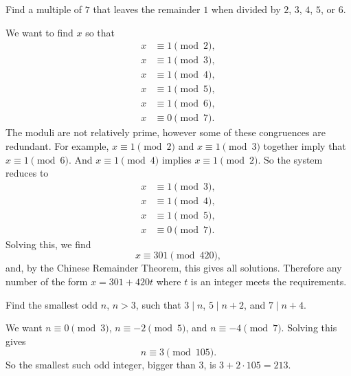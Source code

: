  Find a multiple of $7$ that leaves the remainder $1$ when
divided by $2$, $3$, $4$, $5$, or $6$.
\begin{solution}
  We want to find $x$ so that
  \begin{align*}
    x&\equiv1\pmod2, \\
    x&\equiv1\pmod3, \\
    x&\equiv1\pmod4, \\
    x&\equiv1\pmod5, \\
    x&\equiv1\pmod6, \\
    x&\equiv0\pmod7.
  \end{align*}
  The moduli are not relatively prime, however some of these
  congruences are redundant. For example, $x\equiv1\pmod2$ and
  $x\equiv1\pmod3$ together imply that $x\equiv1\pmod6$. And
  $x\equiv1\pmod4$ implies $x\equiv1\pmod2$. So the system reduces to
  \begin{align*}
    x&\equiv1\pmod3, \\
    x&\equiv1\pmod4, \\
    x&\equiv1\pmod5, \\
    x&\equiv0\pmod7.
  \end{align*}
  Solving this, we find
  \begin{equation*}
    x\equiv301 \pmod{420},
  \end{equation*}
  and, by the Chinese Remainder Theorem, this gives all
  solutions. Therefore any number of the form $x = 301 + 420t$ where
  $t$ is an integer meets the requirements.
\end{solution}

 Find the smallest odd $n$, $n > 3$, such that $3\mid n$,
$5\mid n + 2$, and $7\mid n + 4$.
\begin{solution}
  We want $n\equiv0\pmod3$, $n\equiv-2\pmod5$, and
  $n\equiv-4\pmod7$. Solving this gives
  \begin{equation*}
    n\equiv3\pmod{105}.
  \end{equation*}
  So the smallest such odd integer, bigger than $3$, is
  $3 + 2\cdot105 = 213$.
\end{solution}

